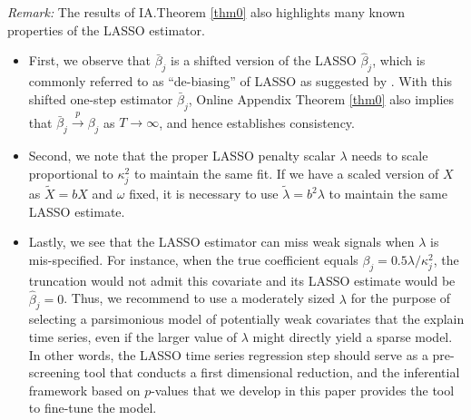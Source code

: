 \documentclass[11pt]{article}
\begin{document}
	\textit{Remark: }The results of IA.Theorem \ref{thm0} also highlights many known properties of the LASSO estimator. 
	\begin{itemize}
		\item First, we observe that $\bar{\beta}_j$ is a shifted version of the LASSO $\hat{\beta}_j$, which is commonly referred to as ``de-biasing'' of LASSO as suggested by \cite{10.1214/17-AOS1630}. With this shifted one-step estimator $\bar{\beta}_j$, Online Appendix Theorem \ref{thm0} also implies that $\bar{\beta}_j\stackrel{p}{\to}\beta_j$ as $T\to\infty$, and hence establishes consistency.
		
		\item Second, we note that the proper LASSO penalty scalar $\lambda$ needs to scale proportional to $\kappa_j^2$ to maintain the same fit. If we have a scaled version of $X$ as $\tilde{X}=bX$ and $\omega$ fixed, it is necessary to use $\tilde{\lambda}= b^2 \lambda $ to maintain the same LASSO estimate.
		
		
		\item Lastly, we see that the LASSO estimator can miss weak signals when $\lambda$ is mis-specified. For instance, when the true coefficient equals $\beta_j=0.5\lambda/\kappa_j^2$, the truncation would not admit this covariate and its LASSO estimate would be $\hat{\beta}_j=0$. Thus, we recommend to use a moderately sized $\lambda$ for the purpose of selecting a parsimonious model of potentially weak covariates that the explain time series, even if the larger value of $\lambda$ might directly yield a sparse model. In other words, the LASSO time series regression step should serve as a pre-screening tool that conducts a first dimensional reduction, and the inferential framework based on $p$-values that we develop in this paper provides the tool to fine-tune the model.
	\end{itemize} 
	
	
	
\end{document}
